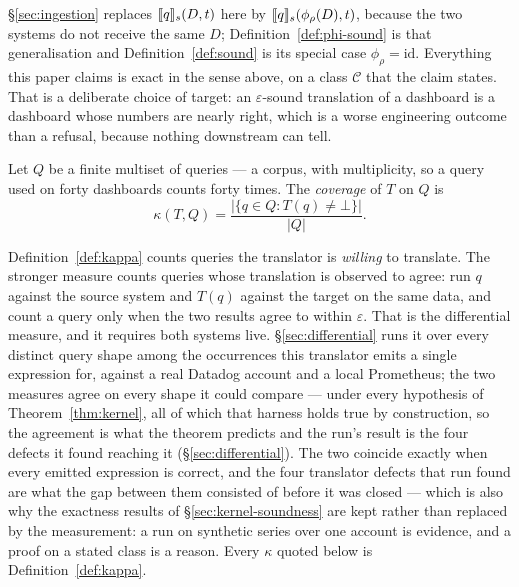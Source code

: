 \noindent
\S\ref{sec:ingestion} replaces $\llbracket q \rrbracket_s(D,t)$ here by
$\llbracket q \rrbracket_s(\phi_\rho(D),t)$, because the two systems do not receive the same $D$;
Definition~\ref{def:phi-sound} is that generalisation and Definition~\ref{def:sound} is
its special case $\phi_\rho=\mathrm{id}$. Everything this paper claims is exact in the
sense above, on a class $\mathcal{C}$ that the claim states. That is a deliberate choice
of target: an $\varepsilon$-sound translation of a dashboard is a dashboard whose numbers
are nearly right, which is a worse engineering outcome than a refusal, because nothing
downstream can tell.

\begin{definition}[Coverage]\label{def:kappa}
Let $Q$ be a finite multiset of queries --- a corpus, with multiplicity, so a query used
on forty dashboards counts forty times. The \emph{coverage} of $T$ on $Q$ is
\[
\kappa(T,Q)=\frac{|\{q\in Q : T(q)\neq\bot\}|}{|Q|}.
\]
\end{definition}

\begin{remark}\label{rem:two-kappas}
Definition~\ref{def:kappa} counts queries the translator is \emph{willing} to translate.
The stronger measure counts queries whose translation is observed to agree: run $q$
against the source system and $T(q)$ against the target on the same data, and count a
query only when the two results agree to within $\varepsilon$. That is the differential
measure, and it requires both systems live. \S\ref{sec:differential} runs it over every
distinct query shape among the occurrences this translator emits a single expression
for, against a real Datadog account and a local Prometheus; the two measures agree on
every shape it could compare --- under every hypothesis of
Theorem~\ref{thm:kernel}, all of which that harness holds true by construction, so the
agreement is what the theorem predicts and the run's result is the four defects it
found reaching it (\S\ref{sec:differential}). The two coincide
exactly when every emitted expression is correct, and the four translator defects that
run found are what the gap between them consisted of before it was closed --- which is
also why the exactness results of \S\ref{sec:kernel-soundness} are kept rather than
replaced by the measurement: a run on synthetic series over one account is evidence, and
a proof on a stated class is a reason. Every $\kappa$ quoted below is
Definition~\ref{def:kappa}.
\end{remark}

